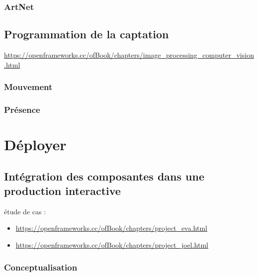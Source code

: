 \documentclass[
]{book}
\begin{document}
\hypertarget{protocole_artnet}{%
\subsection{ArtNet}\label{protocole_artnet}}

\hypertarget{interagir_video}{%
\section{Programmation de la captation}\label{interagir_video}}

\url{https://openframeworks.cc/ofBook/chapters/image_processing_computer_vision.html}

\hypertarget{interagir_mouvement}{%
\subsection{Mouvement}\label{interagir_mouvement}}

\hypertarget{interagir_presence}{%
\subsection{Présence}\label{interagir_presence}}

\hypertarget{deployer}{%
\chapter{Déployer}\label{deployer}}

\hypertarget{intuxe9gration-des-composantes-dans-une-production-interactive}{%
\section{Intégration des composantes dans une production interactive}\label{intuxe9gration-des-composantes-dans-une-production-interactive}}

étude de cas :

\begin{itemize}
\item
  \url{https://openframeworks.cc/ofBook/chapters/project_eva.html}
\item
  \url{https://openframeworks.cc/ofBook/chapters/project_joel.html}
\end{itemize}

\hypertarget{conceptualisation}{%
\subsection{Conceptualisation}\label{conceptualisation}}
\end{document}
